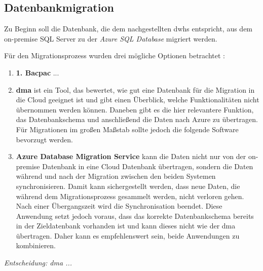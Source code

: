 \subsection{Datenbankmigration} \label{subsec:praktischeUmsetzung:Datenmigration}
Zu Beginn soll die Datenbank, die dem nachgestellten \acp{dwh} entspricht, aus dem on-premise SQL Server zu der \textit{Azure SQL Database} migriert werden. 

Für den Migrationsprozess wurden drei mögliche Optionen betrachtet \cite{soh_microsoft_2020}: 
\begin{enumerate}
\item \textbf{1. Bacpac} ...
\item \textbf{\ac{dma}} ist ein Tool, das bewertet, wie gut eine Datenbank für die Migration in die Cloud geeignet ist und gibt einen Überblick, welche Funktionalitäten nicht übernommen werden können. Daneben gibt es die hier relevantere Funktion, das Datenbankschema und anschließend die Daten nach Azure zu übertragen. Für Migrationen im großen Maßstab sollte jedoch die folgende Software bevorzugt werden. 
\item \textbf{Azure Database Migration Service} kann die Daten nicht nur von der on-premise Datenbank in eine Cloud Datenbank übertragen, sondern die Daten während und nach der Migration zwischen den beiden Systemen synchronisieren. Damit kann sichergestellt werden, dass neue Daten, die während dem Migrationsprozess gesammelt werden, nicht verloren gehen. Nach einer Übergangszeit wird die Synchronisation beendet. Diese Anwendung setzt jedoch voraus, dass das korrekte Datenbankschema bereits in der Zieldatenbank vorhanden ist und kann dieses nicht wie der \ac{dma} übertragen. Daher kann es empfehlenswert sein, beide Anwendungen zu kombinieren.
\end{enumerate}

\textit{Entscheidung: \ac{dma} ...}

